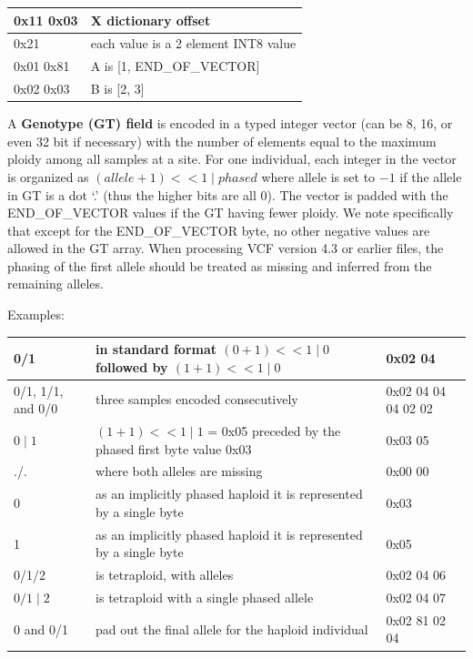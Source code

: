 \documentclass[8pt]{article}
\begin{document}
\vspace{0.3cm}
\begin{tabular}{|p{2cm} | l |} \hline
0x11 0x03 & X dictionary offset \\ \hline
0x21 & each value is a 2 element INT8 value \\ \hline
0x01 0x81 & A is [1, END\_OF\_VECTOR] \\ \hline
0x02 0x03 & B is [2, 3] \\ \hline
\end{tabular}
\vspace{0.3cm}


\vspace{0.3cm}
A \textbf{Genotype (GT) field} is encoded in a typed integer vector (can be 8, 16, or even 32 bit if necessary) with the number of elements equal to the maximum ploidy among all samples at a site.
For one individual, each integer in the vector is organized as $(allele+1) << 1 \mid phased$ where allele is set to $-1$ if the allele in GT is a dot `.' (thus the higher bits are all 0).
The vector is padded with the END\_OF\_VECTOR values if the GT having fewer ploidy.
We note specifically that except for the END\_OF\_VECTOR byte, no other negative values are allowed in the GT array.
When processing VCF version 4.3 or earlier files, the phasing of the first allele should be treated as missing and inferred from the remaining alleles.

Examples:

\vspace{0.3cm}
\small
\begin{tabular}{|p{2.5cm} | p{10cm} | p{3cm}|} \hline
0/1 & in standard format $(0 + 1) << 1 \mid 0$ followed by $(1 + 1) << 1 \mid 0$ & 0x02 04 \\ \hline
0/1, 1/1, and 0/0 & three samples encoded consecutively & 0x02 04 04 04 02 02 \\ \hline
$0\mid1$ & $(1 + 1) << 1 \mid 1$ = 0x05 preceded by the phased first byte value 0x03 & 0x03 05 \\ \hline
./. & where both alleles are missing & 0x00 00 \\ \hline
0 & as an implicitly phased haploid it is represented by a single byte & 0x03 \\ \hline
1 & as an implicitly phased haploid it is represented by a single byte & 0x05 \\ \hline
0/1/2 & is tetraploid, with alleles & 0x02 04 06 \\ \hline
$0/1\mid2$ & is tetraploid with a single phased allele & 0x02 04 07 \\ \hline
0 and 0/1 & pad out the final allele for the haploid individual & 0x02 81 02 04\\ \hline
\end{tabular}
\normalsize
\end{document}
